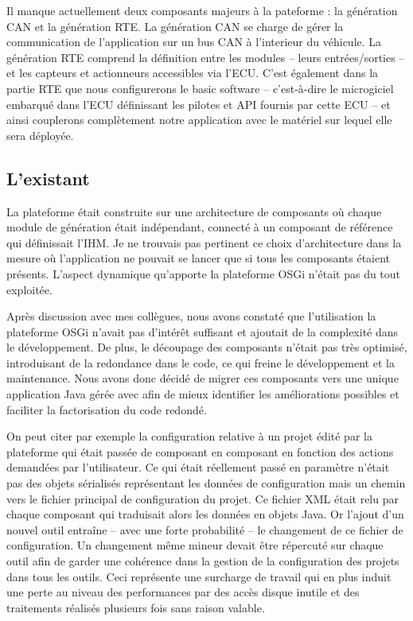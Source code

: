 Il manque actuellement deux composants majeurs à la pateforme : la génération
CAN et la génération RTE. La génération CAN se charge de gérer la communication
de l'application sur un bus CAN à l'interieur du véhicule. La génération RTE
comprend la définition entre les modules -- leurs entrées/sorties -- et les
capteurs et actionneurs accessibles via l'ECU. C'est également dans la partie
RTE que nous configurerons le \og basic software \fg{} -- c'est-à-dire le
microgiciel embarqué dans l'ECU définissant les pilotes et API fournis par cette
ECU -- et ainsi couplerons complètement notre application avec le matériel sur
lequel elle sera déployée.

\subsection{L'existant}
La plateforme était construite sur une architecture de composants 
où chaque module de génération était indépendant, connecté à un composant de
référence qui définissait l'IHM. Je ne trouvais pas pertinent ce choix
d'architecture dans la mesure où l'application ne pouvait se lancer que si tous
les composants étaient présents. L'aspect dynamique qu'apporte la plateforme
OSGi n'était pas du tout exploitée.

Après discussion avec mes collègues, nous avons constaté que l'utilisation la
plateforme OSGi n'avait pas d'intérêt suffisant et ajoutait de la complexité
dans le développement. De plus, le découpage des composants n'était pas très
optimisé, introduisant de la redondance dans le code, ce qui freine le
développement et la maintenance. Nous avons donc décidé de migrer ces composants
vers une unique application Java gérée avec  afin de mieux
identifier les améliorations possibles et faciliter la factorisation du code
redondé.

On peut citer par exemple la configuration relative à un projet édité par la
plateforme qui était passée de composant en composant en fonction des actions
demandées par l'utilisateur. Ce qui était réellement passé en paramètre n'était
pas des objets sérialisés représentant les données de configuration mais un
chemin vers le fichier principal de configuration du projet. Ce fichier XML
était relu par chaque composant qui traduisait alors les données en objets Java.
Or l'ajout d'un nouvel outil entraîne -- avec une forte probabilité -- le
changement de ce fichier de configuration. Un changement même mineur devait être
répercuté sur chaque outil afin de garder une cohérence dans la gestion de la
configuration des projets dans tous les outils. Ceci représente une surcharge de
travail qui en plus induit une perte au niveau des performances par des accès
disque inutile et des traitements réalisés plusieurs fois sans raison valable.

